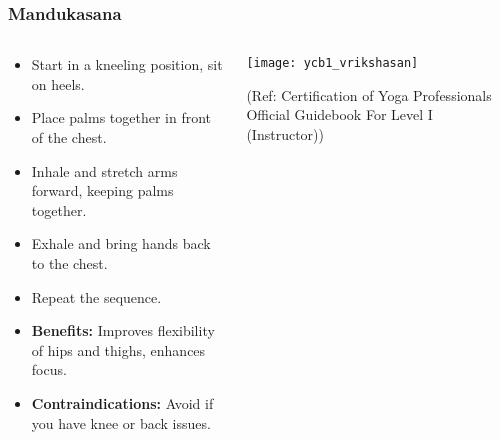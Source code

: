 \begin{frame}[fragile]\frametitle{Mandukasana}
\begin{columns}
    \begin{column}[T]{0.5\linewidth}
      \begin{itemize}
        \item Start in a kneeling position, sit on heels.
        \item Place palms together in front of the chest.
        \item Inhale and stretch arms forward, keeping palms together.
        \item Exhale and bring hands back to the chest.
        \item Repeat the sequence.
        \item \textbf{Benefits:} Improves flexibility of hips and thighs, enhances focus.
        \item \textbf{Contraindications:} Avoid if you have knee or back issues.
      \end{itemize}
    \end{column}
    \begin{column}[T]{0.5\linewidth}
        \begin{center}
        \begin{center}
		        \texttt{[image: ycb1\_vrikshasan]}
				
				{\tiny (Ref: Certification  of Yoga Professionals Official Guidebook For Level I (Instructor))}	        
		\end{center}   
        \end{center}    
    \end{column}
  \end{columns}
\end{frame}

